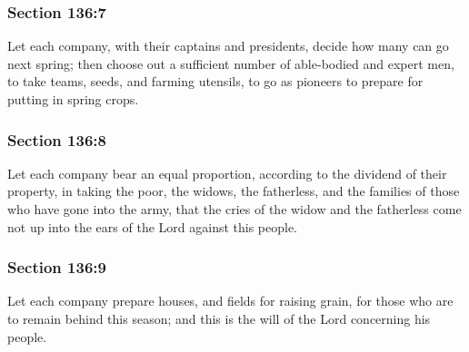 	\subsubsection{Section 136:7} %
		\label{DC136-7}

		Let each company, with their captains and presidents, decide how many can go next spring; then choose out a sufficient number of able-bodied and expert men, to take teams, seeds, and farming utensils, to go as pioneers to prepare for putting in spring crops.


	\subsubsection{Section 136:8} %
		\label{DC136-8}

		Let each company bear an equal proportion, according to the dividend of their property, in taking the poor, the widows, the fatherless, and the families of those who have gone into the army, that the cries of the widow and the fatherless come not up into the ears of the Lord against this people.


	\subsubsection{Section 136:9} %
		\label{DC136-9}

		Let each company prepare houses, and fields for raising grain, for those who are to remain behind this season; and this is the will of the Lord concerning his people.

